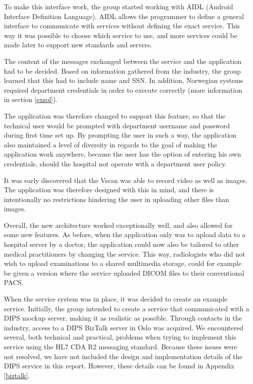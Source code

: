 To make this interface work, the group started working with AIDL (Android Interface Definition Language). AIDL allows the programmer to define a general interface to communicate with services without defining the exact service. This way it was possible to choose which service to use, and more services could be made later to support new standards and servers.

The content of the messages exchanged between the service and the application had to be decided. Based on information gathered from the industry, the group learned that this had to include name and SSN. In addition, Norwegian systems required department credentials in order to execute correctly (more information in section \ref{exsol}).

The application was therefore changed to support this feature, so that the technical user would be prompted with department username and password during first time set up. By prompting the user in such a way, the application also maintained a level of diversity in regards to the goal of making the application work anywhere, because the user has the option of entering his own credentials, should the hospital not operate with a department user policy.

It was early discovered that the Vscan was able to record video as well as images. The application was therefore designed with this in mind, and there is intentionally no restrictions hindering the user in uploading other files than images.

Overall, the new architecture worked exceptionally well, and also allowed for some new features. As before, when the application only was to upload data to a hospital server by a doctor, the application could now also be tailored to other medical practitioners by changing the service. This way, radiologists who did not wish to upload examinations to a shared multimedia storage, could for example be given a version where the service uploaded DICOM files to their conventional PACS.

When the service system was in place, it was decided to create an example service. Initially, the group intended to create a service that communicated with a DIPS mockup server, making it as realistic as possible. Through contacts in the industry, access to a DIPS BizTalk server in Oslo was acquired. We encountered several, both technical and practical, problems when trying to implement this service using the HL7 CDA R2 messaging standard. Because these issues were not resolved, we have not included the design and implementation details of the DIPS service in this report. However, these details can be found in Appendix \ref{biztalk}. 

